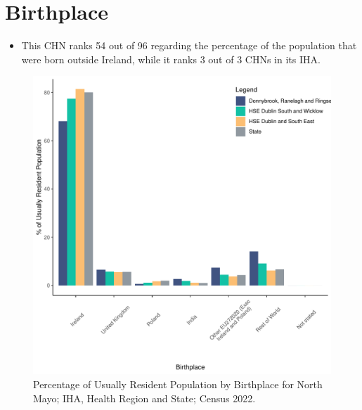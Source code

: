 \documentclass{article}
\begin{document}
\section{Birthplace}\label{sect:Birth}
\begin{itemize}
\item This CHN ranks  54 out of 96 regarding the percentage of the population that were born outside Ireland, while it ranks  3 out of 3 CHNs in its IHA.
\end{itemize}
\begin{figure}[H]
	\centering
	\includegraphics[width = 130mm]{../figures/BirthED.pdf}
	\caption{Percentage of Usually Resident Population by Birthplace for North Mayo; IHA, Health Region and State; Census 2022.}
	\label{fig:vbnv}
	\end{figure}
	
\end{document}
